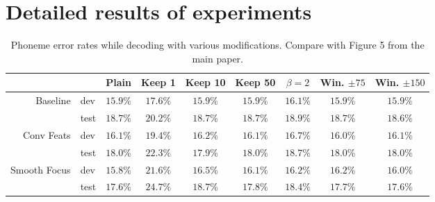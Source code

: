 \clearpage
\section{Detailed results of experiments}

\begin{table}[h]
  \centering
  \caption{Phoneme error rates while decoding with various
    modifications. Compare with Figure 5 from the main paper.}
\setlength\tabcolsep{5pt}
\begin{tabular}{rl|c|c|c|c|c|c|c}
             &         &   Plain  &  Keep 1  & Keep 10  & Keep 50  &
             $\beta=2$ & Win. $\pm 75$ & Win. $\pm 150$ \\ \hline \hline
\multirow{2}{*}{Baseline} &     dev & $15.9\%$ & $17.6\%$ & $15.9\%$ & $15.9\%$ &   $16.1\%$ &       $15.9\%$ &        $15.9\%$ \\
             &    test & $18.7\%$ & $20.2\%$ & $18.7\%$ & $18.7\%$ &
             $18.9\%$ &       $18.7\%$ &        $18.6\%$ \\ \hline
\multirow{2}{*}{Conv Feats} &     dev & $16.1\%$ & $19.4\%$ & $16.2\%$ & $16.1\%$ &   $16.7\%$ &       $16.0\%$ &        $16.1\%$ \\
             &    test & $18.0\%$ & $22.3\%$ & $17.9\%$ & $18.0\%$ &
             $18.7\%$ &       $18.0\%$ &        $18.0\%$ \\ \hline
\multirow{2}{*}{Smooth Focus} &     dev & $15.8\%$ & $21.6\%$ & $16.5\%$ & $16.1\%$ &   $16.2\%$ &       $16.2\%$ &        $16.0\%$ \\
             &    test & $17.6\%$ & $24.7\%$ & $18.7\%$ & $17.8\%$ &   $18.4\%$ &       $17.7\%$ &        $17.6\%$ \\
\end{tabular}
  \label{tab:decoding_singles}
\end{table}


%
%
